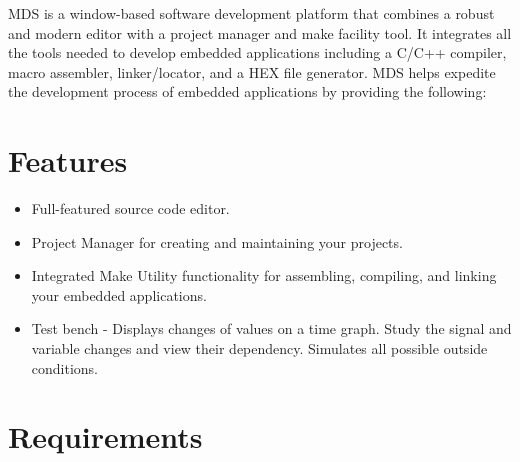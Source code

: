 MDS is a window-based software development platform that
combines a robust and modern editor with a project manager
and make facility tool. It integrates all the tools needed
to develop embedded applications including a C/C++ compiler, macro
assembler, linker/locator, and a HEX file generator. MDS helps
expedite the development process of embedded applications by providing
the following:

\section{Features}
    \begin{itemize}
        \item Full-featured source code editor.
        \item Project Manager for creating and maintaining your projects.
        \item Integrated Make Utility functionality for assembling, compiling, and linking your embedded applications.
        \item Test bench - Displays changes of values on a time graph. Study the signal and variable changes and view their dependency. Simulates all possible outside conditions.
    \end{itemize}

\section{Requirements}
